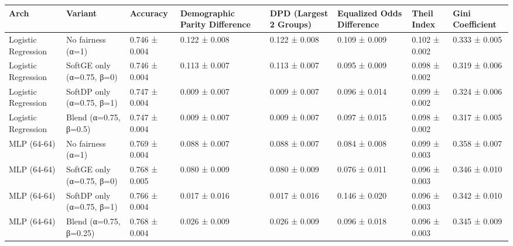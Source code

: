 \begin{tabular}{llllllll}
\toprule
Arch & Variant & Accuracy & Demographic Parity Difference & DPD (Largest 2 Groups) & Equalized Odds Difference & Theil Index & Gini Coefficient \\
\midrule
Logistic Regression & No fairness (α=1) & 0.746 ± 0.004 & 0.122 ± 0.008 & 0.122 ± 0.008 & 0.109 ± 0.009 & 0.102 ± 0.002 & 0.333 ± 0.005 \\
Logistic Regression & SoftGE only (α=0.75, β=0) & 0.746 ± 0.004 & 0.113 ± 0.007 & 0.113 ± 0.007 & 0.095 ± 0.009 & 0.098 ± 0.002 & 0.319 ± 0.006 \\
Logistic Regression & SoftDP only (α=0.75, β=1) & 0.747 ± 0.004 & 0.009 ± 0.007 & 0.009 ± 0.007 & 0.096 ± 0.014 & 0.099 ± 0.002 & 0.324 ± 0.006 \\
Logistic Regression & Blend (α=0.75, β=0.5) & 0.747 ± 0.004 & 0.009 ± 0.007 & 0.009 ± 0.007 & 0.097 ± 0.015 & 0.098 ± 0.002 & 0.317 ± 0.005 \\
MLP (64-64) & No fairness (α=1) & 0.769 ± 0.004 & 0.088 ± 0.007 & 0.088 ± 0.007 & 0.084 ± 0.008 & 0.099 ± 0.003 & 0.358 ± 0.007 \\
MLP (64-64) & SoftGE only (α=0.75, β=0) & 0.768 ± 0.005 & 0.080 ± 0.009 & 0.080 ± 0.009 & 0.076 ± 0.011 & 0.096 ± 0.003 & 0.346 ± 0.010 \\
MLP (64-64) & SoftDP only (α=0.75, β=1) & 0.766 ± 0.004 & 0.017 ± 0.016 & 0.017 ± 0.016 & 0.146 ± 0.020 & 0.096 ± 0.003 & 0.342 ± 0.010 \\
MLP (64-64) & Blend (α=0.75, β=0.25) & 0.768 ± 0.004 & 0.026 ± 0.009 & 0.026 ± 0.009 & 0.096 ± 0.018 & 0.096 ± 0.003 & 0.345 ± 0.009 \\
\bottomrule
\end{tabular}
